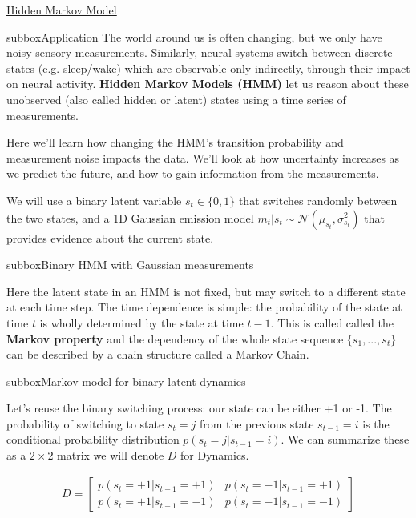 \begin{textbox}{\href{http://instructor.compneuro.neuromatch.io/tutorials/W3D2_HiddenDynamics/instructor/W3D2_Tutorial2.html}{Hidden Markov Model }   }

\begin{subbox}{subbox}{Application}
\scriptsize
The world around us is often changing, but we only have noisy sensory measurements. Similarly, neural systems switch between discrete states (e.g. sleep/wake) which are observable only indirectly, through their impact on neural activity. \textbf{Hidden Markov Models (HMM)} let us reason about these unobserved (also called hidden or latent) states using a time series of measurements. 

Here we'll learn how changing the HMM's transition probability and measurement noise impacts the data. We'll look at how uncertainty increases as we predict the future, and how to gain information from the measurements.

We will use a binary latent variable $s_t \in \{0,1\}$ that switches randomly between the two states, and a 1D Gaussian emission model $m_t|s_t \sim \mathcal{N}(\mu_{s_t},\sigma^2_{s_t})$ that provides evidence about the current state.

\end{subbox}
\begin{subbox}{subbox}{Binary HMM with Gaussian measurements}
\scriptsize

Here the latent state in an HMM is not fixed, but may switch to a different state at each time step. The time dependence is simple: the probability of the state at time $t$ is wholly determined by the state at time $t-1$. This is called called the \textbf{Markov property} and the dependency of the whole state sequence $\{s_1,...,s_t\}$ can be described by a chain structure called a Markov Chain. 

\end{subbox}
\begin{subbox}{subbox}{Markov model for binary latent dynamics}
\scriptsize

Let's reuse the binary switching process: our state can be either +1 or -1. The probability of switching to state $s_t=j$ from the previous state $s_{t-1}=i$ is the conditional probability distribution $p(s_t = j| s_{t-1} = i)$. We can summarize these as a $2\times 2$ matrix we will denote $D$ for Dynamics.

\begin{align*}
D = \begin{bmatrix}p(s_t = +1 | s_{t-1} = +1) & p(s_t = -1 | s_{t-1} = +1)\\p(s_t = +1 | s_{t-1} = -1)& p(s_t = -1 | s_{t-1} = -1)\end{bmatrix}
\end{align*}


\end{subbox}
\end{textbox}
